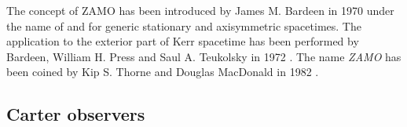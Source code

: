 \begin{hist}
The concept of ZAMO has been introduced by James M. Bardeen in 1970 \cite{Barde70}
under the name of  and for generic stationary and axisymmetric spacetimes. The application
to the exterior part of Kerr spacetime has been performed by Bardeen, William H. Press and Saul A. Teukolsky
in 1972 \cite{BardePT72}. The name \emph{ZAMO} has been coined by Kip S. Thorne and Douglas MacDonald
in 1982 \cite{ThornM82}.
\end{hist}

\subsection{Carter observers} \label{s:ker:Carter_obs}

